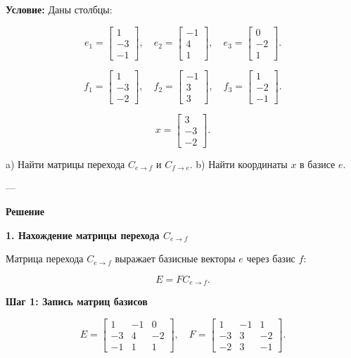 \textbf{Условие:}  
Даны столбцы:

\[
e_1 = \begin{bmatrix} 1 \\ -3 \\ -1 \end{bmatrix}, \quad
e_2 = \begin{bmatrix} -1 \\ 4 \\ 1 \end{bmatrix}, \quad
e_3 = \begin{bmatrix} 0 \\ -2 \\ 1 \end{bmatrix}.
\]

\[
f_1 = \begin{bmatrix} 1 \\ -3 \\ -2 \end{bmatrix}, \quad
f_2 = \begin{bmatrix} -1 \\ 3 \\ 3 \end{bmatrix}, \quad
f_3 = \begin{bmatrix} 1 \\ -2 \\ -1 \end{bmatrix}.
\]

\[
x = \begin{bmatrix} 3 \\ -3 \\ -2 \end{bmatrix}.
\]

a) Найти матрицы перехода \( C_{e \to f} \) и \( C_{f \to e} \).  
b) Найти координаты \( x \) в базисе \( e \).

---

\textbf{Решение}  

\textbf{1. Нахождение матрицы перехода \( C_{e \to f} \)}

Матрица перехода \( C_{e \to f} \) выражает базисные векторы \( e \) через базис \( f \):

\[
E = F C_{e \to f}.
\]

\textbf{Шаг 1: Запись матриц базисов}

\[
E = \begin{bmatrix} 
1 & -1 & 0 \\ 
-3 & 4 & -2 \\ 
-1 & 1 & 1
\end{bmatrix}, 
\quad
F = \begin{bmatrix} 
1 & -1 & 1 \\ 
-3 & 3 & -2 \\ 
-2 & 3 & -1
\end{bmatrix}.
\]


